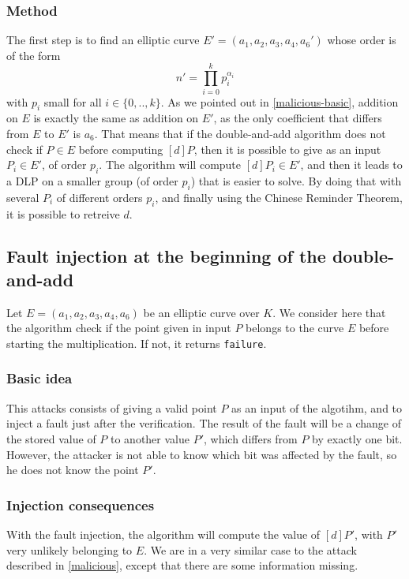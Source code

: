 \documentclass[journal]{IEEEtran}
\begin{document}
\subsubsection{Method} 
The first step is to find an elliptic curve $E' = (a_1, a_2, a_3, a_4, a_6')$ whose order is of the form
$$n' = \prod_{i = 0}^{k}p_i^{\alpha_i}$$
with $p_i$ small for all $i \in \{0, .., k\}$. As we pointed out in \ref{malicious-basic}, addition on $E$ is 
exactly the same as addition on $E'$, as the only coefficient that differs from $E$ to $E'$ is $a_6$. That means 
that if the double-and-add algorithm does not check if $P \in E$ before computing $[d]P$, then it is possible to 
give as an input $P_i \in E'$, of order $p_i$. The algorithm will compute $[d]P_i \in E'$, and then it leads to a DLP on a smaller 
group (of order $p_i$) that is easier to solve. By doing that with several $P_i$ of different orders $p_i$, and finally using 
the Chinese Reminder Theorem, it is possible to retreive $d$.

\subsection{Fault injection at the beginning of the double-and-add}
Let $E = (a_1, a_2, a_3, a_4, a_6)$ be an elliptic curve over $K$.
We consider here that the algorithm check if the point given in input $P$ belongs
to the curve $E$ before starting the multiplication. If not, it returns {\tt failure}.\\

\subsubsection{Basic idea}
This attacks consists of giving a valid point $P$ as an input of the algotihm, and to 
inject a fault just after the verification. The result of the fault will be a change of the
stored value of $P$ to another value $P'$, which differs from $P$ by exactly one bit. 
However, the attacker is not able to know which bit was affected by the fault, so he 
does not know the point $P'$. \\

\subsubsection{Injection consequences}
With the fault injection, the algorithm will compute the value of $[d]P'$, with $P'$ very unlikely
belonging to $E$. We are in a very similar case to the attack described in \ref{malicious}, except that
there are some information missing. \\
\end{document}
